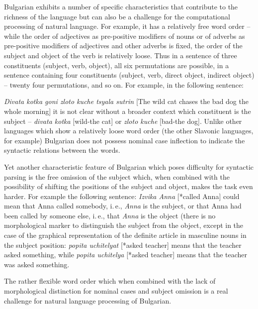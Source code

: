 \begin{multicols}{2}

  Bulgarian exhibits a number of specific characteristics that contribute to the richness of the language but can also be a challenge for the computational processing of natural language. For example, it has a relatively free word order – while the order of adjectives as pre-positive modifiers of nouns or of adverbs as pre-positive modifiers of adjectives and other adverbs is fixed, the order of the subject and object of the verb is relatively loose. Thus in a sentence of three constituents (subject, verb, object), all six permutations are possible, in a sentence containing four constituents (subject, verb, direct object, indirect object) -- twenty four permutations, and so on. For example, in the following sentence:

   \textit{{Divata kotka goni zloto kuche tsyala sutrin}} [The wild cat chases the bad dog the whole morning] it is not clear without a broader context which constituent is the subject -- \textit{{divata kotka}} [wild-the cat] or \textit{{zloto kuche}} [bad-the dog]. Unlike other languages which show a relatively loose word order (the other Slavonic languages, for example) Bulgarian does not possess nominal case inflection to indicate the syntactic relations between the words.

  Yet another characteristic feature of Bulgarian which poses difficulty for syntactic parsing is the free omission of the subject which, when combined with the possibility of shifting the positions of the subject and object, makes the task even harder. For example the following sentence: \textit{{Izvika Anna}} [*called Anna] could mean that Anna called somebody, i.\,e.,  \textit{Anna} is the subject, or that Anna had been called by someone else, i.\,e., that  \textit{Anna} is the object (there is no morphological marker to distinguish the subject from the object, except in the case of the graphical representation of the definite article in masculine nouns in the subject position: \textit{{popita uchitelyat}} [*asked teacher] means that the teacher asked something, while \textit{{popita uchitelya}} [*asked teacher] means that the teacher was asked something. 

  The rather flexible word order which when combined with the lack of morphological distinction for nominal cases and subject omission is a real challenge for natural language processing of Bulgarian.


\end{multicols}
